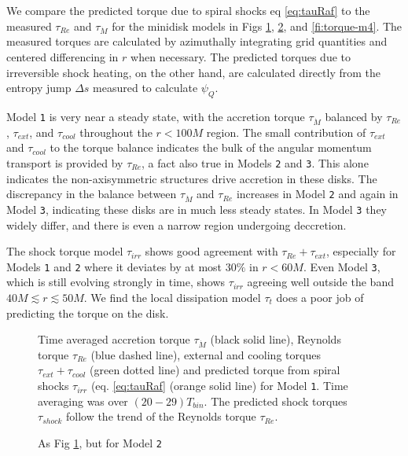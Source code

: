 \documentclass{emulateapj}
\newcommand{\De}{\Delta}
\newcommand{\model}[1]{{Model \texttt{#1}}}
\begin{document}
We compare the predicted torque due to spiral shocks eq \eqref{eq:tauRaf} to the measured $\tau_{Re}$ and $\tau_{\dot{M}}$ for the minidisk models in Figs \ref{fi:torque-m2}, \ref{fi:torque-m3}, and \ref{fi:torque-m4}.  The measured torques are calculated by azimuthally integrating grid quantities and centered differencing in $r$ when necessary.  The predicted torques due to irreversible shock heating, on the other hand, are calculated directly from the entropy jump $\De s$ measured to calculate $\psi_Q$.  

\model{1} is very near a steady state, with the accretion torque $\tau_{\dot{M}}$ balanced by $\tau_{Re}$, $\tau_{ext}$, and $\tau_{cool}$ throughout the $r < 100M$ region.  The small contribution of $\tau_{ext}$ and $\tau_{cool}$ to the torque balance indicates the bulk of the angular momentum transport is provided by $\tau_{Re}$, a fact also true in Models \texttt{2} and \texttt{3}.  This alone indicates the non-axisymmetric structures drive accretion in these disks.  The discrepancy in the balance between $\tau_{\dot{M}}$ and $\tau_{Re}$ increases in \model{2} and again in \model{3}, indicating these disks are in much less steady states.  In \model{3} they widely differ, and there is even a narrow region undergoing deccretion.  

The shock torque model $\tau_{irr}$ shows good agreement with $\tau_{Re}+\tau_{ext}$, especially for Models \texttt{1} and \texttt{2} where it deviates by at most $30\%$ in $r < 60M$.  Even \model{3}, which is still evolving strongly in time, shows $\tau_{irr}$ agreeing well outside the band $40M \lesssim r \lesssim 50M$.  We find the local dissipation model $\tau_t$ does a poor job of predicting the torque on the disk.

\begin{figure}
	\caption{\label{fi:torque-m2} Time averaged accretion torque $\tau_{\dot{M}}$ (black solid line), Reynolds torque $\tau_{Re}$ (blue dashed line), external and cooling torques $\tau_{ext}+\tau_{cool}$ (green dotted line) and predicted torque from spiral shocks $\tau_{irr}$ (eq. \eqref{eq:tauRaf} (orange solid line) for \model{1}. Time averaging was over $(20-29)T_{bin}$.  The predicted shock torques $\tau_{shock}$ follow the trend of the Reynolds torque $\tau_{Re}$.}  
\end{figure}

\begin{figure}
	\caption{\label{fi:torque-m3} As Fig \ref{fi:torque-m2}, but for \model{2}}  
\end{figure}
\end{document}
